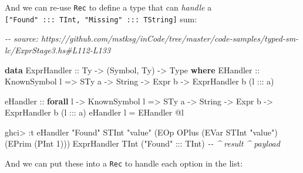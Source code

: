 \documentclass[]{article}
\newenvironment{Shaded}{}{}
\newcommand{\CommentTok}[1]{\textcolor[rgb]{0.38,0.63,0.69}{\textit{#1}}}
\newcommand{\DataTypeTok}[1]{\textcolor[rgb]{0.56,0.13,0.00}{#1}}
\newcommand{\DecValTok}[1]{\textcolor[rgb]{0.25,0.63,0.44}{#1}}
\newcommand{\KeywordTok}[1]{\textcolor[rgb]{0.00,0.44,0.13}{\textbf{#1}}}
\newcommand{\NormalTok}[1]{#1}
\newcommand{\OperatorTok}[1]{\textcolor[rgb]{0.40,0.40,0.40}{#1}}
\newcommand{\OtherTok}[1]{\textcolor[rgb]{0.00,0.44,0.13}{#1}}
\newcommand{\StringTok}[1]{\textcolor[rgb]{0.25,0.44,0.63}{#1}}
\begin{document}
And we can re-use \texttt{Rec} to define a type that can \emph{handle} a
\texttt{{[}"Found"\ :::\ TInt,\ "Missing"\ :::\ TString{]}} sum:

\begin{Shaded}
\begin{Highlighting}[]
\CommentTok{{-}{-} source: https://github.com/mstksg/inCode/tree/master/code{-}samples/typed{-}sm{-}lc/ExprStage3.hs\#L112{-}L133}

\KeywordTok{data} \DataTypeTok{ExprHandler}\OtherTok{ ::} \DataTypeTok{Ty} \OtherTok{{-}\textgreater{}}\NormalTok{ (}\DataTypeTok{Symbol}\NormalTok{, }\DataTypeTok{Ty}\NormalTok{) }\OtherTok{{-}\textgreater{}} \DataTypeTok{Type} \KeywordTok{where}
  \DataTypeTok{EHandler}\OtherTok{ ::} \DataTypeTok{KnownSymbol}\NormalTok{ l }\OtherTok{=\textgreater{}} \DataTypeTok{STy}\NormalTok{ a }\OtherTok{{-}\textgreater{}} \DataTypeTok{String} \OtherTok{{-}\textgreater{}} \DataTypeTok{Expr}\NormalTok{ b }\OtherTok{{-}\textgreater{}} \DataTypeTok{ExprHandler}\NormalTok{ b (l }\OperatorTok{:::}\NormalTok{ a)}

\OtherTok{eHandler ::} \KeywordTok{forall}\NormalTok{ l }\OtherTok{{-}\textgreater{}} \DataTypeTok{KnownSymbol}\NormalTok{ l }\OtherTok{=\textgreater{}} \DataTypeTok{STy}\NormalTok{ a }\OtherTok{{-}\textgreater{}} \DataTypeTok{String} \OtherTok{{-}\textgreater{}} \DataTypeTok{Expr}\NormalTok{ b }\OtherTok{{-}\textgreater{}} \DataTypeTok{ExprHandler}\NormalTok{ b (l }\OperatorTok{:::}\NormalTok{ a)}
\NormalTok{eHandler l }\OtherTok{=} \DataTypeTok{EHandler} \OperatorTok{@}\NormalTok{l}
\end{Highlighting}
\end{Shaded}

\begin{Shaded}
\begin{Highlighting}[]
\NormalTok{ghci}\OperatorTok{\textgreater{}} \OperatorTok{:}\NormalTok{t eHandler }\StringTok{"Found"} \DataTypeTok{STInt} \StringTok{"value"}\NormalTok{ (}\DataTypeTok{EOp} \DataTypeTok{OPlus}\NormalTok{ (}\DataTypeTok{EVar} \DataTypeTok{STInt} \StringTok{"value"}\NormalTok{) (}\DataTypeTok{EPrim}\NormalTok{ (}\DataTypeTok{PInt} \DecValTok{1}\NormalTok{)))}
\DataTypeTok{ExprHandler} \DataTypeTok{TInt}\NormalTok{ (}\StringTok{"Found"} \OperatorTok{:::} \DataTypeTok{TInt}\NormalTok{)}
         \CommentTok{{-}{-} \^{} result           \^{} payload}
\end{Highlighting}
\end{Shaded}

And we can put these into a \texttt{Rec} to handle each option in the list:
\end{document}
